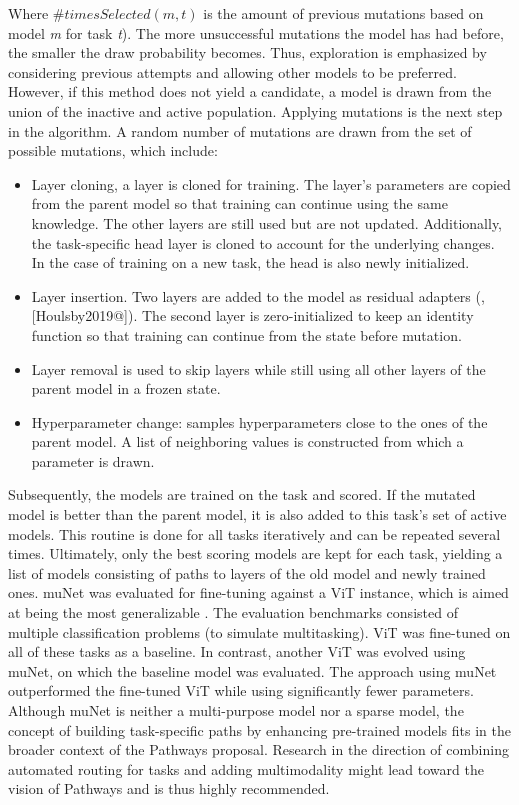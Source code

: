 \documentclass[
]{krantz}
\providecommand{\tightlist}{%
  \setlength{\itemsep}{0pt}\setlength{\parskip}{0pt}}
\begin{document}
Where \(\#timesSelected(m, t)\) is the amount of previous mutations based on model \emph{m} for task \emph{t}). The more unsuccessful mutations the model has had before, the smaller the draw probability becomes. Thus, exploration is emphasized by considering previous attempts and allowing other models to be preferred. However, if this method does not yield a candidate, a model is drawn from the union of the inactive and active population.
Applying mutations is the next step in the algorithm. A random number of mutations are drawn from the set of possible mutations, which include:

\begin{itemize}
\tightlist
\item
  Layer cloning, a layer is cloned for training. The layer's parameters are copied from the parent model so that training can continue using the same knowledge. The other layers are still used but are not updated. Additionally, the task-specific head layer is cloned to account for the underlying changes. In the case of training on a new task, the head is also newly initialized.
\item
  Layer insertion. Two layers are added to the model as residual adapters (\citep{Rebuffi2017}, {[}Houlsby2019@{]}). The second layer is zero-initialized to keep an identity function so that training can continue from the state before mutation.
\item
  Layer removal is used to skip layers while still using all other layers of the parent model in a frozen state.
\item
  Hyperparameter change: samples hyperparameters close to the ones of the parent model. A list of neighboring values is constructed from which a parameter is drawn.
\end{itemize}

Subsequently, the models are trained on the task and scored. If the mutated model is better than the parent model, it is also added to this task's set of active models. This routine is done for all tasks iteratively and can be repeated several times. Ultimately, only the best scoring models are kept for each task, yielding a list of models consisting of paths to layers of the old model and newly trained ones.
muNet was evaluated for fine-tuning against a ViT instance, which is aimed at being the most generalizable \citep{Steiner2021}. The evaluation benchmarks consisted of multiple classification problems (to simulate multitasking). ViT was fine-tuned on all of these tasks as a baseline. In contrast, another ViT was evolved using muNet, on which the baseline model was evaluated. The approach using muNet outperformed the fine-tuned ViT while using significantly fewer parameters.
Although muNet is neither a multi-purpose model nor a sparse model, the concept of building task-specific paths by enhancing pre-trained models fits in the broader context of the Pathways proposal. Research in the direction of combining automated routing for tasks and adding multimodality might lead toward the vision of Pathways and is thus highly recommended.
\end{document}
